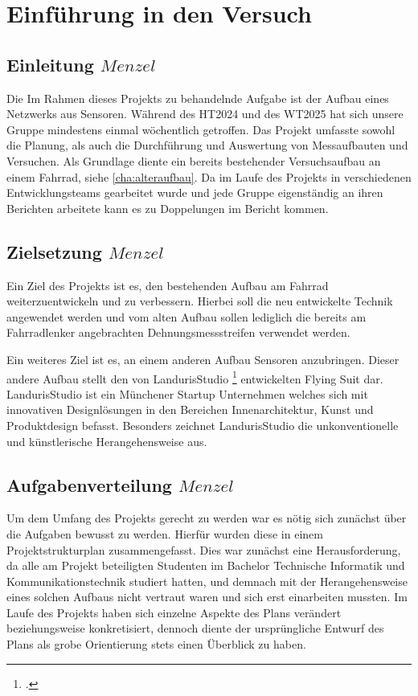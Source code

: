 \chapter{Einführung in den Versuch}
\label{cha:einfuehrung}
\todo{}
\section{Einleitung \(Menzel\)}

Die Im Rahmen dieses Projekts zu behandelnde Aufgabe ist der Aufbau eines Netzwerks aus Sensoren.
Während des HT2024 und des WT2025 hat sich unsere Gruppe mindestens einmal wöchentlich getroffen.
Das Projekt umfasste sowohl die Planung, als auch die Durchführung und Auswertung von Messaufbauten und Versuchen.
Als Grundlage diente ein bereits bestehender Versuchsaufbau an einem Fahrrad, siehe \ref{cha:alteraufbau}.
Da im Laufe des Projekts in verschiedenen Entwicklungsteams gearbeitet wurde und jede Gruppe eigenständig an ihren Berichten arbeitete kann es zu Doppelungen im Bericht kommen.

\section{Zielsetzung \(Menzel\)}
Ein Ziel des Projekts ist es, den bestehenden Aufbau am Fahrrad weiterzuentwickeln und zu verbessern.
Hierbei soll die neu entwickelte Technik angewendet werden und vom alten Aufbau sollen lediglich die bereits am Fahrradlenker angebrachten Dehnungsmessstreifen verwendet werden.

Ein weiteres Ziel ist es, an einem anderen Aufbau Sensoren anzubringen.
Dieser andere Aufbau stellt den von LandurisStudio \footcite{https://www.landuris.com/} entwickelten Flying Suit dar.
LandurisStudio ist ein Münchener Startup Unternehmen welches sich mit innovativen Designlösungen in den Bereichen Innenarchitektur, Kunst und Produktdesign befasst.
Besonders zeichnet LandurisStudio die unkonventionelle und künstlerische Herangehensweise aus.


\newpage
\section{Aufgabenverteilung \(Menzel\)}
Um dem Umfang des Projekts gerecht zu werden war es nötig sich zunächst über die Aufgaben bewusst zu werden.
Hierfür wurden diese in einem Projektstrukturplan zusammengefasst. Dies war zunächst eine Herausforderung, da alle am Projekt beteiligten Studenten im Bachelor Technische Informatik und Kommunikationstechnik studiert hatten,
und demnach mit der Herangehensweise eines solchen Aufbaus nicht vertraut waren und sich erst einarbeiten mussten.
Im Laufe des Projekts haben sich einzelne Aspekte des Plans verändert beziehungsweise konkretisiert, dennoch diente der ursprüngliche Entwurf des Plans als grobe Orientierung stets einen Überblick zu haben.

